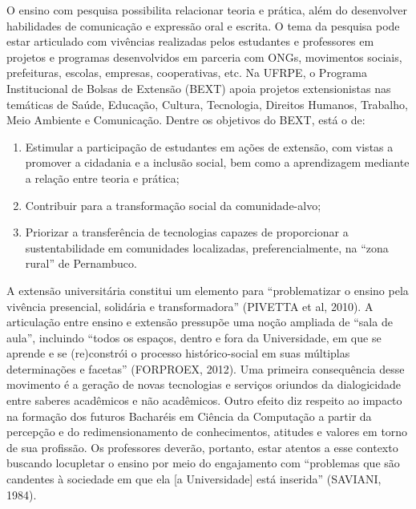 \documentclass[
	12pt,				%
	openright,			%
  oneside,     %
	a4paper,			%
	chapter=TITLE,		%
	english,			%
	french,				%
	spanish,			%
	brazil				%
	]{abntex2}
\begin{document}
O ensino com pesquisa possibilita relacionar teoria e prática, além do desenvolver habilidades de comunicação e expressão oral e escrita. O tema da pesquisa pode estar articulado com vivências realizadas pelos estudantes e professores em projetos e programas desenvolvidos em parceria com ONGs, movimentos sociais, prefeituras, escolas, empresas, cooperativas, etc. Na UFRPE, o Programa Institucional de Bolsas de Extensão (BEXT) apoia projetos extensionistas nas temáticas de Saúde, Educação, Cultura, Tecnologia, Direitos Humanos, Trabalho, Meio Ambiente e Comunicação. Dentre os objetivos do BEXT, está o de:

\begin{enumerate}[label=(\alph*)]
    \item Estimular a participação de estudantes em ações de extensão, com vistas a promover a cidadania e a inclusão social, bem como a aprendizagem mediante a relação entre teoria e prática;
    \item Contribuir para a transformação social da comunidade-alvo;
    \item Priorizar a transferência de tecnologias capazes de proporcionar a sustentabilidade em comunidades localizadas, preferencialmente, na “zona rural” de Pernambuco. 	
\end{enumerate}

A extensão universitária constitui um elemento para “problematizar o ensino pela vivência presencial, solidária e transformadora” (PIVETTA et al, 2010). A articulação entre ensino e extensão pressupõe uma noção ampliada de “sala de aula”, incluindo “todos os espaços, dentro e fora da Universidade, em que se aprende e se (re)constrói o processo histórico-social em suas múltiplas determinações e facetas” (FORPROEX, 2012). Uma primeira consequência desse movimento é a geração de novas tecnologias e serviços oriundos da dialogicidade entre saberes acadêmicos e não acadêmicos. Outro efeito diz respeito ao impacto na formação dos futuros Bacharéis em Ciência da Computação a partir da percepção e do redimensionamento de conhecimentos, atitudes e valores em torno de sua profissão. Os professores deverão, portanto, estar atentos a esse contexto buscando locupletar o ensino por meio do engajamento com “problemas que são candentes à sociedade em que ela [a Universidade] está inserida” (SAVIANI, 1984).  


%
%
\end{document}

